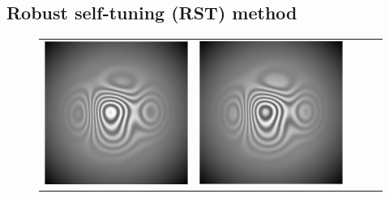 \documentclass[letterpaper,12pt]{article}   %
\begin{document}
\subsection{Robust self-tuning (RST) method}
\begin{figure}[th]
  \begin{center}
    \begin{tabular}{ c c c c c }
      \includegraphics[scale=0.20]{figures/Interferograma.png} }&
    \includegraphics[scale=0.20]{figures/Interferograma2.png}}&

\end{tabular}
\end{center}
\end{figure}
\end{document}
